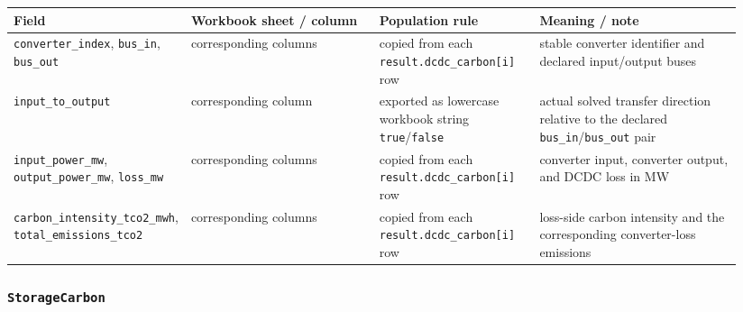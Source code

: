 \begin{longtable}{@{}L{0.18\linewidth}L{0.26\linewidth}L{0.22\linewidth}L{0.28\linewidth}@{}}
\toprule
Field & Workbook sheet / column & Population rule & Meaning / note \\
\midrule
\endhead
\texttt{converter\_index}, \texttt{bus\_in}, \texttt{bus\_out} & corresponding columns & copied from each \texttt{result.dcdc\_carbon[i]} row & stable converter identifier and declared input/output buses \\
\texttt{input\_to\_output} & corresponding column & exported as lowercase workbook string \texttt{true}/\texttt{false} & actual solved transfer direction relative to the declared \texttt{bus\_in}/\texttt{bus\_out} pair \\
\texttt{input\_power\_mw}, \texttt{output\_power\_mw}, \texttt{loss\_mw} & corresponding columns & copied from each \texttt{result.dcdc\_carbon[i]} row & converter input, converter output, and DCDC loss in MW \\
\texttt{carbon\_intensity\_tco2\_mwh}, \texttt{total\_emissions\_tco2} & corresponding columns & copied from each \texttt{result.dcdc\_carbon[i]} row & loss-side carbon intensity and the corresponding converter-loss emissions \\
\bottomrule
\end{longtable}

\subsubsection*{\texttt{StorageCarbon}}

